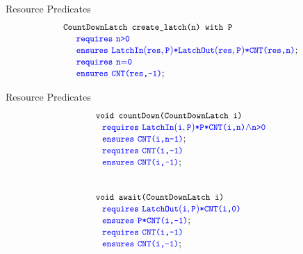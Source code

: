 \begin{frame}{Resource Predicates}
\[
\begin{array}{l}
\code{\CDL~\createlatch(n)~with~P}\\
\SPEC{~~~~\requires~\code{n\sm{\gt}0}} \\
\SPEC{~~~~\ensures~ \LatchIn{res}{P} {\sep}\LatchOut{res}{P}{\sep}\code{CNT(res,n)}}; \\
\SPEC{~~~~\requires~\code{n\sm{=}0}} \\
\SPEC{~~~~\ensures~ \code{CNT(res,-1)}}; \\
\end{array}
\]
\end{frame}

\begin{frame}{Resource Predicates}
\[
\begin{array}{l}
\code{void~countDown(\CDL~i)}\\
~~
\SPEC{\requires~\LatchIn{i}{P}{\sep}\code{P}{\sep}\code{CNT(i,n)}\sm{\wedge}\code{n{>}0}}\\ 
~~ \SPEC{\ensures~ \code{CNT(i,n{-}1)}};\\ 
~~
\SPEC{\requires~\code{CNT(i,-1)}}\\
~~ \SPEC{\ensures~ \code{CNT(i,-1)}};\\
\\
\\
\code{void~await(\CDL~i)}\\
~~ \SPEC{\requires~\LatchOut{i}{P}{\sep}\code{CNT(i,0)}}\\
~~ \SPEC{\ensures~ \code{P}{\sep}\code{CNT(i,-1)}};\\
~~ \SPEC{\requires~\code{CNT(i,-1)}}\\
~~ \SPEC{\ensures~ \code{CNT(i,-1)}};%
\end{array}
\]
\end{frame}

